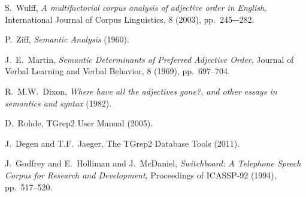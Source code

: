 \documentclass{pnastwo}
\begin{document}
\begin{article}
\begin{thebibliography}{10}
	S.~Wulff, {\em A multifactorial corpus analysis of adjective order in English},
	International Journal of Corpus Linguistics, 8 (2003), pp.~245‒-282.
	
	P.~Ziff, {\em Semantic Analysis} (1960).
	
	J.~E.~Martin, {\em Semantic Determinants of Preferred Adjective Order}, Journal of Verbal Learning and Verbal Behavior, 8 (1969), pp.~697--704. 
	
	R.~M.W.~Dixon, {\em Where have all the adjectives gone?, and other essays in semantics and syntax} (1982).
	
	D.~Rohde, TGrep2 User Manual (2005).
	
	J.~Degen and T.F.~Jaeger, The TGrep2 Database Tools (2011).
	
	J.~Godfrey and E.~Holliman and J.~McDaniel, {\em Switchboard: A Telephone Speech Corpus for Research and Development}, Proceedings of ICASSP-92 (1994),
	pp.~517--520.
\end{thebibliography}


\end{article}
\end{document}
